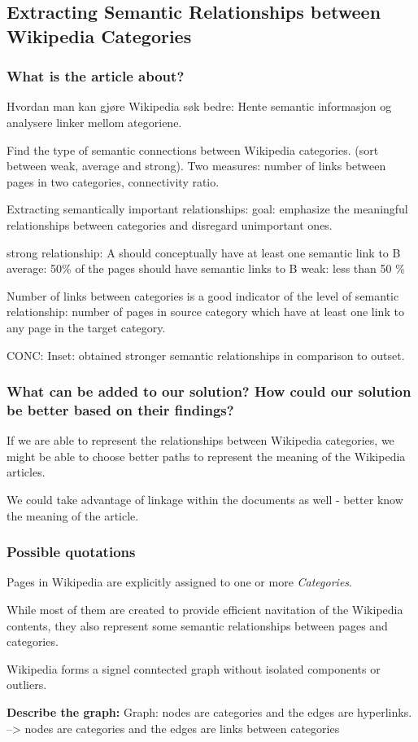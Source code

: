 \subsection{Extracting Semantic Relationships between Wikipedia Categories}

\subsubsection{What is the article about?}
Hvordan man kan gjøre Wikipedia søk bedre: Hente semantic informasjon og analysere linker mellom ategoriene. 

Find the type of semantic connections between Wikipedia categories. (sort between weak, average and strong).  Two measures: number of links between pages in two categories, connectivity ratio.

Extracting semantically important relationships: 
goal: emphasize the meaningful relationships between categories and disregard unimportant ones. 


strong relationship: A should conceptually have at least one semantic link to B
average: 50\% of the pages should have semantic links to B
weak: less than 50 \%

Number of links between categories is a good indicator of the level of semantic relationship: number of pages in source category which have at least one link to any page in the target category. 

CONC: Inset: obtained stronger semantic relationships in comparison to outset. 



\subsubsection{What can be added to our solution? How could our solution be better based on their findings?}
If we are able to represent the relationships between Wikipedia categories, we might be able to choose better paths to represent the meaning of the Wikipedia articles. 

We could take advantage of linkage within the documents as well - better know the meaning of the article. 


\subsubsection{Possible quotations}
Pages in Wikipedia are explicitly assigned to one or more \emph{Categories}. 

While most of them are created to provide efficient navitation of the Wikipedia contents, they also represent some semantic relationships between pages and categories. 

Wikipedia forms a signel conntected graph without isolated components or outliers. 



\textbf{Describe the graph: }
Graph: nodes are categories and the edges are hyperlinks. 
--> nodes are categories and the edges are links between categories 



